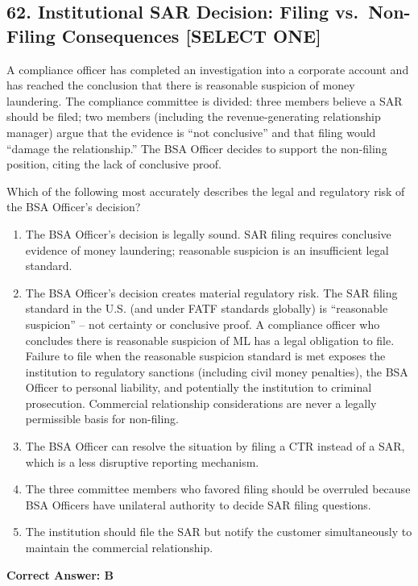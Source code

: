 \documentclass[11pt,a4paper]{article}
\begin{document}
	\subsection{62. Institutional SAR Decision: Filing vs.\ Non-Filing Consequences \textnormal{[SELECT ONE]}}
	
	A compliance officer has completed an investigation into a corporate account and has reached the conclusion that there is reasonable suspicion of money laundering. The compliance committee is divided: three members believe a SAR should be filed; two members (including the revenue-generating relationship manager) argue that the evidence is ``not conclusive'' and that filing would ``damage the relationship.'' The BSA Officer decides to support the non-filing position, citing the lack of conclusive proof.
	
	Which of the following most accurately describes the legal and regulatory risk of the BSA Officer's decision?
	
	\begin{enumerate}[label=\Alph*.]
		\item The BSA Officer's decision is legally sound. SAR filing requires conclusive evidence of money laundering; reasonable suspicion is an insufficient legal standard.
		\item The BSA Officer's decision creates material regulatory risk. The SAR filing standard in the U.S. (and under FATF standards globally) is ``reasonable suspicion'' -- not certainty or conclusive proof. A compliance officer who concludes there is reasonable suspicion of ML has a legal obligation to file. Failure to file when the reasonable suspicion standard is met exposes the institution to regulatory sanctions (including civil money penalties), the BSA Officer to personal liability, and potentially the institution to criminal prosecution. Commercial relationship considerations are never a legally permissible basis for non-filing.
		\item The BSA Officer can resolve the situation by filing a CTR instead of a SAR, which is a less disruptive reporting mechanism.
		\item The three committee members who favored filing should be overruled because BSA Officers have unilateral authority to decide SAR filing questions.
		\item The institution should file the SAR but notify the customer simultaneously to maintain the commercial relationship.
	\end{enumerate}
	\textbf{Correct Answer: B}
	
\end{document}
